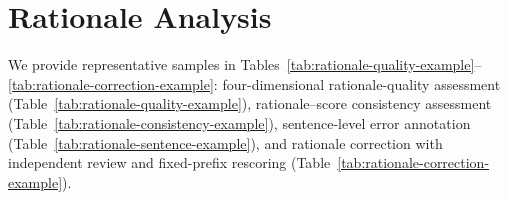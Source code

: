 \section{Rationale Analysis}
\label{app:rationale-analysis}


We provide representative samples in
Tables~\ref{tab:rationale-quality-example}--\ref{tab:rationale-correction-example}:
four-dimensional rationale-quality assessment
(Table~\ref{tab:rationale-quality-example}), rationale--score consistency
assessment (Table~\ref{tab:rationale-consistency-example}), sentence-level
error annotation (Table~\ref{tab:rationale-sentence-example}), and rationale
correction with independent review and fixed-prefix rescoring
(Table~\ref{tab:rationale-correction-example}).


